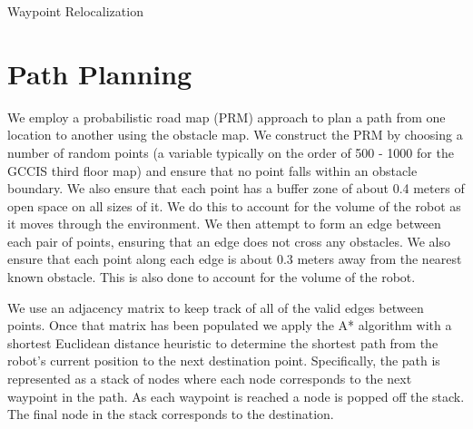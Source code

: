 \documentclass[12pt]{article}
\begin{document}
\begin{algorithm}[H]
\caption{Waypoint Relocalization}
\label{alg:waypointloc}
\begin{algorithmic}[1]

	\ENDIF
\ENDIF

\end{algorithmic}
\end{algorithm}


\section{Path Planning}

We employ a probabilistic road map (PRM) approach to plan a path from one location to another using the obstacle map. We construct the PRM by choosing a number of random points (a variable typically on the order of 500 - 1000 for the GCCIS third floor map) and ensure that no point falls within an obstacle boundary. We also ensure that each point has a buffer zone of about 0.4 meters of open space on all sizes of it. We do this to account for the volume of the robot as it moves through the environment. We then attempt to form an edge between each pair of points, ensuring that an edge does not cross any obstacles. We also ensure that each point along each edge is about 0.3 meters away from the nearest known obstacle. This is also done to account for the volume of the robot. 

We use an adjacency matrix to keep track of all of the valid edges between points. Once that matrix has been populated we apply the A* algorithm with a shortest Euclidean distance heuristic to determine the shortest path from the robot's current position to the next destination point. Specifically, the path is represented as a stack of nodes where each node corresponds to the next waypoint in the path. As each waypoint is reached a node is popped off the stack. The final node in the stack corresponds to the destination.
\end{document}
